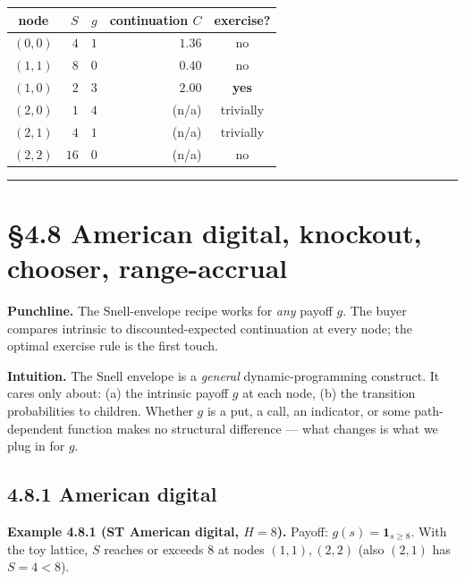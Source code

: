 \documentclass[
  10pt,
  twoside]{book}
\newcounter{none} %
\begin{document}
{\def\LTcaptype{none} %
\begin{table}[H]
\centering
\begin{tabular}{|c|r|r|r|c|}
\toprule
node & \(S\) & \(g\) & continuation \(C\) & exercise? \\
\midrule



\((0,0)\) & \(\phantom{0}4\) & \(1\) & \(1.36\) & no \\
\((1,1)\) & \(\phantom{0}8\) & \(0\) & \(0.40\) & no \\
\((1,0)\) & \(\phantom{0}2\) & \(3\) & \(2.00\) & \textbf{yes} \\
\((2,0)\) & \(\phantom{0}1\) & \(4\) & (n/a) & trivially \\
\((2,1)\) & \(\phantom{0}4\) & \(1\) & (n/a) & trivially \\
\((2,2)\) & \(16\) & \(0\) & (n/a) & no \\
\bottomrule
\end{tabular}
\end{table}
}

\begin{center}\rule{0.5\linewidth}{0.5pt}\end{center}

\section{§4.8 American digital, knockout, chooser,
range-accrual}\label{american-digital-knockout-chooser-range-accrual}

\textbf{Punchline.} The Snell-envelope recipe works for \emph{any}
payoff \(g\). The buyer compares intrinsic to discounted-expected
continuation at every node; the optimal exercise rule is the first
touch.

\textbf{Intuition.} The Snell envelope is a \emph{general}
dynamic-programming construct. It cares only about: (a) the intrinsic
payoff \(g\) at each node, (b) the transition probabilities to children.
Whether \(g\) is a put, a call, an indicator, or some path-dependent
function makes no structural difference --- what changes is what we plug
in for \(g\).

\subsection{4.8.1 American digital}\label{american-digital}

\textbf{Example 4.8.1 (ST American digital, \(H = 8\)).} Payoff:
\(g(s) = \mathbf{1}_{s \ge 8}\). With the toy lattice, \(S\) reaches or
exceeds \(8\) at nodes \((1, 1), (2, 2)\) (also \((2, 1)\) has
\(S = 4 < 8\)).
\end{document}

